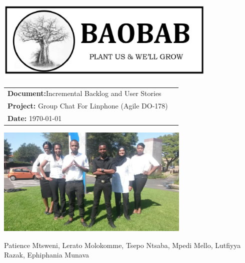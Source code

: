 \begin{titlepage}

\begin{center}

\includegraphics[width=400px]{pictures/logo.jpg}
\vspace{0.5 cm}
\begin{flushright} \large
\begin{tabular}{lr}
\vspace{1 cm}
\LARGE\textbf{Document:}Incremental Backlog and User Stories\\

\vspace{1 cm}
\LARGE\textbf{Project:} Group Chat For Linphone (Agile DO-178)\\
\LARGE\textbf{Date: }\today\\
\end{tabular}
\end{flushright}

\centering \includegraphics[width=350px]{pictures/Team.jpg}

Patience Mtsweni, Lerato Molokomme, Tsepo Ntsaba, Mpedi Mello, Lutfiyya Razak, Ephiphania Munava\\


\end{center}
\end{titlepage}